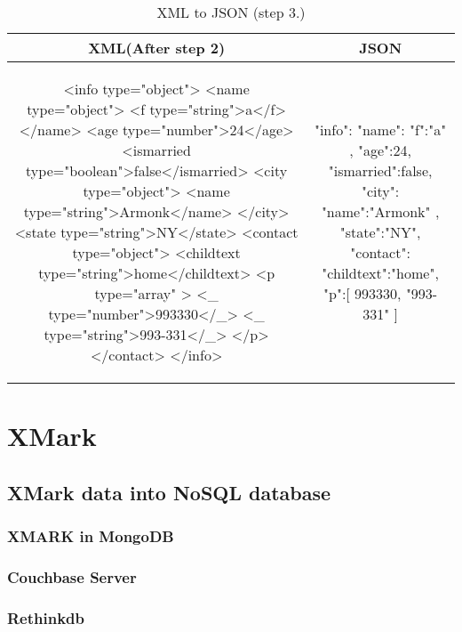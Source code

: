 	\begin{longtable}{c|c}
	\caption{XML to JSON (step 3.)}
	\label{tbl:xmljson-convert-3}\\
	\textbf{XML(After step 2)} & \textbf{JSON}\\
	\hline
\begin{minipage}{.55\textwidth}
\begin{fakeXML}
<info type="object">
  <name type="object">
    <f type="string">a</f>
  </name>
  <age type="number">24</age>
  <ismarried type="boolean">false</ismarried>
  <city type="object">
    <name type="string">Armonk</name>
  </city>
  <state type="string">NY</state>
  <contact type="object">
	<childtext type="string">home</childtext>
    <p  type="array" >
	   <_ type="number">993330</_>
	   <_ type="string">993-331</_>
    </p>
  </contact>
</info>
\end{fakeXML}	
\end{minipage} &
\begin{minipage}{.5\textwidth}
\begin{fakeJSON}
{
    "info":{
      "name":{
        "f":"a"
      },
      "age":24,
      "ismarried":false,
      "city":{
        "name":"Armonk"
      },
      "state":"NY",
      "contact":{
	   "childtext":"home",
        "p":[
          993330,
          "993-331"
        ]
      }
    }
}
\end{fakeJSON}
\end{minipage}\\
\end{longtable}
	
\section{XMark}\label{xmark}
			
		\subsection{XMark data into NoSQL database}\label{xmark-nosql}
			
			\subsubsection{XMARK in MongoDB}\label{xmark-mongodb}
				
			\subsubsection{Couchbase Server}\label{xmark-couchbase}
				
			\subsubsection{Rethinkdb}\label{xmark-rethinkdb}
				